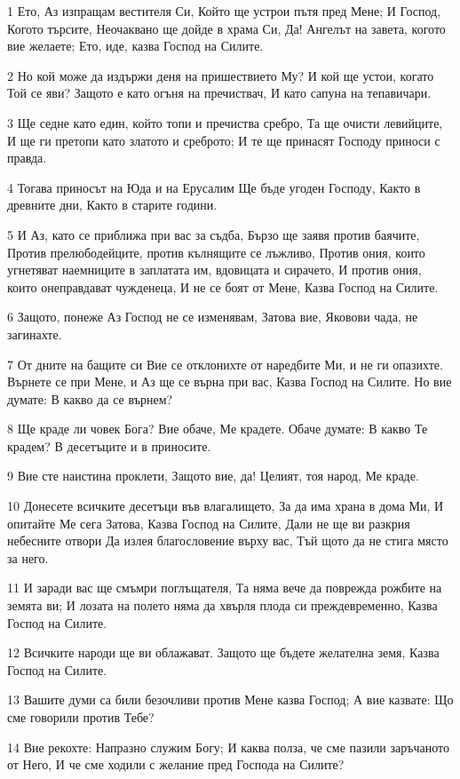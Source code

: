 \par 1 Ето, Аз изпращам вестителя Си, Който ще устрои пътя пред Мене; И Господ, Когото търсите, Неочаквано ще дойде в храма Си, Да! Ангелът на завета, когото вие желаете; Ето, иде, казва Господ на Силите.
\par 2 Но кой може да издържи деня на пришествието Му? И кой ще устои, когато Той се яви? Защото е като огъня на пречиствач, И като сапуна на тепавичари.
\par 3 Ще седне като един, който топи и пречиства сребро, Та ще очисти левийците, И ще ги претопи като златото и среброто; И те ще принасят Господу приноси с правда.
\par 4 Тогава приносът на Юда и на Ерусалим Ще бъде угоден Господу, Както в древните дни, Както в старите години.
\par 5 И Аз, като се приближа при вас за съдба, Бързо ще заявя против баячите, Против прелюбодейците, против кълнящите се лъжливо, Против ония, които угнетяват наемниците в заплатата им, вдовицата и сирачето, И против ония, които онеправдават чужденеца, И не се боят от Мене, Казва Господ на Силите.
\par 6 Защото, понеже Аз Господ не се изменявам, Затова вие, Яковови чада, не загинахте.
\par 7 От дните на бащите си Вие се отклонихте от наредбите Ми, и не ги опазихте. Върнете се при Мене, и Аз ще се върна при вас, Казва Господ на Силите. Но вие думате: В какво да се върнем?
\par 8 Ще краде ли човек Бога? Вие обаче, Ме крадете. Обаче думате: В какво Те крадем? В десетъците и в приносите.
\par 9 Вие сте наистина проклети, Защото вие, да! Целият, тоя народ, Ме краде.
\par 10 Донесете всичките десетъци във влагалището, За да има храна в дома Ми, И опитайте Ме сега Затова, Казва Господ на Силите, Дали не ще ви разкрия небесните отвори Да излея благословение върху вас, Тъй щото да не стига място за него.
\par 11 И заради вас ще смъмри поглъщателя, Та няма вече да поврежда рожбите на земята ви; И лозата на полето няма да хвърля плода си преждевременно, Казва Господ на Силите.
\par 12 Всичките народи ще ви облажават. Защото ще бъдете желателна земя, Казва Господ на Силите.
\par 13 Вашите думи са били безочливи против Мене казва Господ; А вие казвате: Що сме говорили против Тебе?
\par 14 Вие рекохте: Напразно служим Богу; И каква полза, че сме пазили заръчаното от Него, И че сме ходили с желание пред Господа на Силите?
